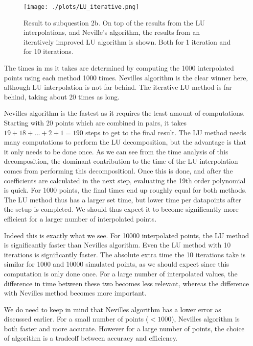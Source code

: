 \begin{figure}[h!]
  \centering
  \texttt{[image: ./plots/LU\_iterative.png]}
  \caption{Result to subquestion 2b. On top of the results from the LU interpolations, and Neville's algorithm, the results from an iteratively improved LU algorithm is shown. Both for 1 iteration and for 10 iterations.}
  \label{fig:LU_iterative}
\end{figure}

The times in ms it takes are determined by computing the 1000 interpolated points using each method 1000 times. Nevilles algorithm is the clear winner here, although LU interpolation is not far behind. The iterative LU method is far behind, taking about 20 times as long.

Nevilles algorithm is the fastest as it requires the least amount of computations. Starting with 20 points which are combined in pairs, it takes $19+18+...+2+1=190$ steps to get to the final result. The LU method needs many computations to perform the LU decomposition, but the advantage is that it only needs to be done once. As we can see from the time analysis of this decomposition, the dominant contribution to the time of the LU interpolation comes from performing this decompositionl. Once this is done, and after the coefficients are calculated in the next step, evaluating the 19th order polynomial is quick. For 1000 points, the final times end up roughly equal for both methods. The LU method thus has a larger set time, but lower time per datapoints after the setup is completed. We should thus expect it to become significantly more efficient for a larger number of interpolated points.

Indeed this is exactly what we see. For 10000 interpolated points, the LU method is significantly faster than Nevilles algorithm. Even the LU method with 10 iterations is significantly faster. The absolute extra time the 10 iterations take is similar for 1000 and 10000 simulated points, as we should expect since this computation is only done once. For a large number of interpolated values, the difference in time between these two becomes less relevant, whereas the difference with Nevilles method becomes more important.

We do need to keep in mind that Nevilles algorithm has a lower error as discussed earlier. For a small number of points ($<1000$), Nevilles algorithm is both faster and more accurate. However for a large number of points, the choice of algorithm is a tradeoff between accuracy and efficiency.




